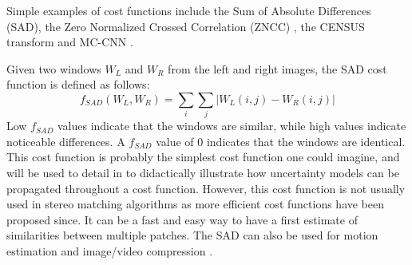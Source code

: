 \begin{example}\label{ex:cost_functions}
	Simple examples of cost functions include the Sum of Absolute Differences (SAD), the Zero Normalized Crossed Correlation (ZNCC)  \cite{hannah_computer_1994}, the CENSUS transform \cite{zabih_non-parametric_1994} and MC-CNN \cite{zbontar_stereo_2016}.
	
	Given two windows $W_L$ and $W_R$ from the left and right images, the SAD cost function is defined as follows:
	\begin{equation}
		f_{SAD}(W_L, W_R)  = \sum_i\sum_j | W_L(i,j) - W_R(i,j) |
	\end{equation}
	Low $f_{SAD}$ values indicate that the windows are similar, while high values indicate noticeable differences. A $f_{SAD}$ value of $0$ indicates that the windows are identical. This cost function is probably the simplest cost function one could imagine, and will be used to detail in  to didactically illustrate how uncertainty models can be propagated throughout a cost function. However, this cost function is not usually used in stereo matching algorithms as more efficient cost functions have been proposed since. It can be a fast and easy way to have a first estimate of similarities between multiple patches. The SAD can also be used for motion estimation and image/video compression \cite{richardson_h264_2006}.
	

\end{example}
